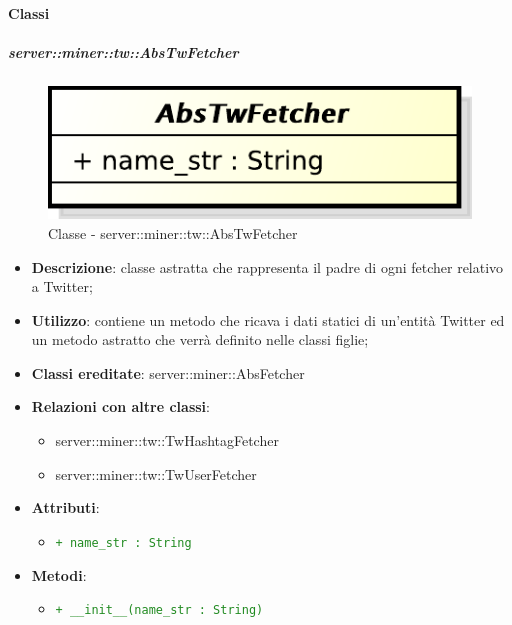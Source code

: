 	\paragraph{Classi} %
	\subparagraph{server::miner::tw::AbsTwFetcher} %
		\label{subp:server_miner_tw_AbsTwFetcher}
		    \begin{figure}[H]
 		 		\centering
 				\centerline{\includegraphics[scale=0.75]{./images/server/classes/miner/abs_tw_fetcher.pdf}}
 				\caption{Classe - server::miner::tw::AbsTwFetcher}
			\end{figure}
			\begin{itemize}
				\item \textbf{Descrizione}: classe astratta che rappresenta il padre di ogni fetcher relativo a Twitter;
				\item \textbf{Utilizzo}: contiene un metodo che ricava i dati statici di un'entità Twitter ed un metodo astratto che verrà definito nelle classi figlie;
				\item \textbf{Classi ereditate}: server::miner::AbsFetcher
				\item \textbf{Relazioni con altre classi}:
					\begin{itemize}
						\item server::miner::tw::TwHashtagFetcher
						\item server::miner::tw::TwUserFetcher
					\end{itemize}
				\item \textbf{Attributi}:   
					\begin{itemize}
						\item \textcolor{forestgreen}{\texttt{+ name\_str : String}}
					\end{itemize}
				\item \textbf{Metodi}:  
					\begin{itemize}
						\item \textcolor{forestgreen}{\texttt{+ \_\_init\_\_(name\_str : String)}}
					\end{itemize}
			\end{itemize}

